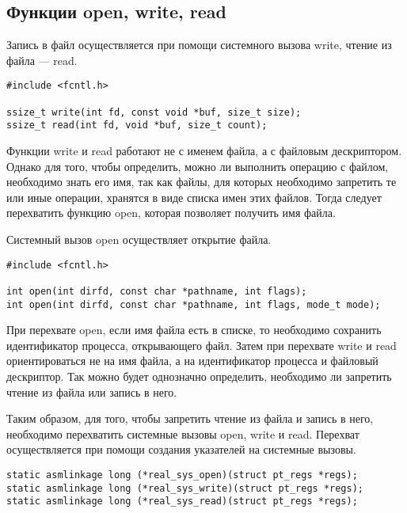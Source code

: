 \subsection{Функции open, write, read}

Запись в файл осуществляется при помощи системного вызова  write, чтение из файла --- read.
\begin{lstlisting}[label=code:read_write,caption=Функции write и read]
#include <fcntl.h>

ssize_t write(int fd, const void *buf, size_t size);
ssize_t read(int fd, void *buf, size_t count);
\end{lstlisting}

Функции write и read работают не с именем файла, а с файловым дескриптором. Однако для того, чтобы определить, можно ли выполнить операцию с файлом, необходимо знать его имя, так как файлы, для которых необходимо запретить те или иные операции, хранятся в виде списка имен этих файлов. Тогда следует перехватить функцию open, которая позволяет получить имя файла.

Системный вызов open осуществляет открытие файла.

\begin{lstlisting}[label=code:open,caption=Функция open]
#include <fcntl.h>
	
int open(int dirfd, const char *pathname, int flags);
int open(int dirfd, const char *pathname, int flags, mode_t mode);
\end{lstlisting}

При перехвате open, если имя файла есть в списке, то необходимо сохранить идентификатор процесса, открывающего файл. Затем при перехвате write и read ориентироваться не на имя файла, а на идентификатор процесса и файловый дескриптор. Так можно будет однозначно определить, необходимо ли запретить чтение из файла или запись в него.

Таким образом, для того, чтобы запретить чтение из файла и запись в него, необходимо перехватить системные вызовы open, write и read.
Перехват осуществляется при помощи создания указателей на системные вызовы.

\begin{lstlisting}[label=code:unlink_p,caption=Указатели на open{,} write и read.]
static asmlinkage long (*real_sys_open)(struct pt_regs *regs);
static asmlinkage long (*real_sys_write)(struct pt_regs *regs);
static asmlinkage long (*real_sys_read)(struct pt_regs *regs);
\end{lstlisting}

